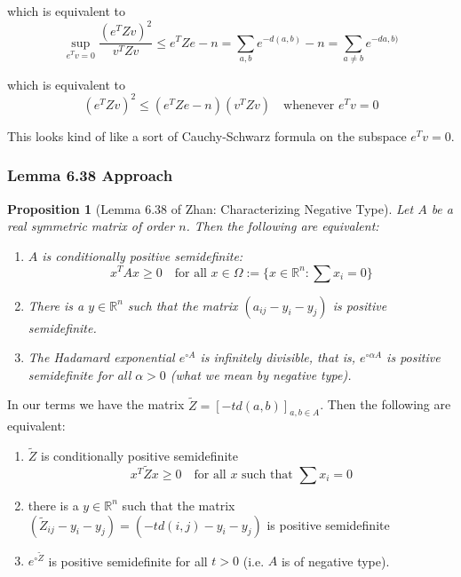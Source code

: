 \documentclass[11pt]{article}
\theoremstyle{definition}
\theoremstyle{definition}
\theoremstyle{plain}
\theoremstyle{plain}
\newtheorem*{prop}{Proposition}
\theoremstyle{plain}
\theoremstyle{definition}
\begin{document}
which is equivalent to
\begin{equation*}
\sup\limits_{e^Tv=0}\frac{(e^TZv)^2}{v^TZv} \leq e^TZe - n = \sum\limits_{a,b}e^{-d(a,b)} - n = \sum\limits_{a\neq b} e^{-d{a,b)}}
\end{equation*}

which is equivalent to
\begin{equation*}
(e^TZv)^2 \leq (e^TZe - n)(v^TZv) \quad\text{whenever $e^Tv = 0$}
\end{equation*}

This looks kind of like a sort of Cauchy-Schwarz formula on the subspace $e^Tv=0$.

\subsubsection*{Lemma 6.38 Approach}
\begin{prop}[Lemma 6.38 of Zhan: Characterizing Negative Type]
Let $A$ be a real symmetric matrix of order $n$. Then the following are equivalent:
\begin{enumerate}
\item $A$ is conditionally positive semidefinite:
\begin{equation*}
x^TAx \geq 0 \quad\text{for all $x \in \Omega:=\{x \in \mathbb{R}^n : \sum x_i = 0\}$}
\end{equation*}
\item There is a $y \in \mathbb{R}^n$ such that the matrix $(a_{ij} - y_i - y_j)$ is positive semidefinite.
\item The Hadamard exponential $e^{\circ A}$ is infinitely divisible, that is, $e^{\circ \alpha A}$ is positive semidefinite for all $\alpha > 0$ (what we mean by negative type).
\end{enumerate}
\end{prop}

In our terms we have the matrix $\tilde{Z} = [-td(a,b)]_{a,b \in A}$. Then the following are equivalent:

\begin{enumerate}
\item $\tilde{Z}$ is conditionally positive semidefinite
\begin{equation*}
x^T\tilde{Z}x \geq 0 \quad\text{for all $x$ such that $\sum x_i = 0$}
\end{equation*}
\item there is a $y \in \mathbb{R}^n$ such that the matrix $(\tilde{Z}_{ij}-y_i-y_j) = (-td(i,j) - y_i - y_j)$ is positive semidefinite
\item $e^{\circ \tilde{Z}}$ is positive semidefinite for all $t > 0$ (i.e. $A$ is of negative type).
\end{enumerate}
\end{document}
